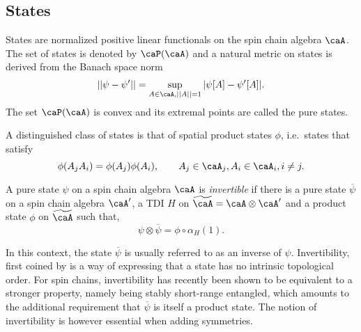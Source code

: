 \subsection{States}\label{sec: states}

States are normalized positive linear functionals on the spin chain algebra $\caA$. The set of states is denoted by $\caP(\caA)$ and a natural metric on states is derived from the Banach space norm
\begin{equation}\label{eq: metric on states}
	||\psi-\psi'|| = \sup_{A \in\caA, ||A||=1} |\psi[A]-\psi'[A]|.
\end{equation}
The set $\caP(\caA)$ is convex and its extremal points are called the pure states.

A distinguished class of states is that of spatial product states $\phi$, i.e.\ states that satisfy
$$
\phi(A_jA_i)= \phi(A_j)\phi( A_i),\qquad  A_j \in\caA_j,A_i\in \caA_i, i\neq j.
$$  
%
%
%

%
%
%
\begin{definition}
	A pure state $\psi$ on a spin chain algebra $\caA$ is \emph{invertible} if there is a pure state $\overline{\psi}$ on a spin chain algebra $\caA'$, a TDI $H$ on $\widetilde \caA= \caA \otimes \caA'$ and a product state $\phi$ on $\widetilde \caA$ such that, 
	\begin{equation}\label{eq: def invertibility}
		\psi\otimes\overline{\psi} =\phi \circ \alpha_H(1).
	\end{equation}
\end{definition}
%
%
%
In this context, the state $\overline{\psi}$ is usually referred to as an inverse of $\psi$.  Invertibility, first coined by \cite{KitaevConf} is a way of expressing that a state has no intrinsic topological order. For spin chains, invertibility has recently been shown \cite{kapustin2021classification} to be equivalent to a stronger property, namely being stably short-range entangled, which amounts to the additional requirement that $\overline{\psi}$ is itself a product state. The notion of invertibility is however essential when adding symmetries. 


